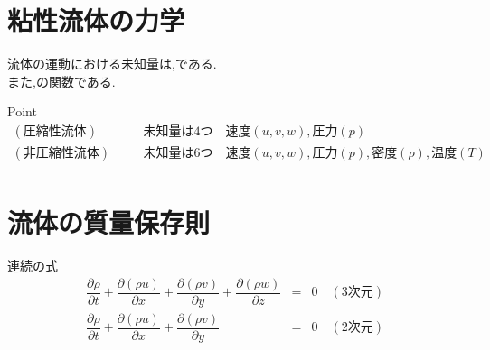 \documentclass[a4paper]{jsarticle}
\begin{document}
\section{粘性流体の力学}
流体の運動における未知量は,である.\\
また,の関数である.\\
\begin{itembox}[l]{Point}
    \begin{eqnarray*}
        (圧縮性流体)&&\quad 未知量は4つ\quad 速度\left(u,v,w\right),圧力\left(p\right)\\
        (非圧縮性流体)&&\quad 未知量は6つ\quad 速度\left(u,v,w\right),圧力\left(p\right),密度\left(\rho\right),温度\left(T\right)\\
    \end{eqnarray*}
\end{itembox}
\section{流体の質量保存則}
\begin{itembox}[l]{連続の式}
    \begin{eqnarray*}
        \dfrac{\partial\rho}{\partial t}+\dfrac{\partial \left(\rho u\right)}{\partial x}+\dfrac{\partial \left(\rho v\right)}{\partial y}+\dfrac{\partial \left(\rho w\right)}{\partial z}&=&0\quad(3次元)\\
        \dfrac{\partial\rho}{\partial t}+\dfrac{\partial \left(\rho u\right)}{\partial x}+\dfrac{\partial \left(\rho v\right)}{\partial y}&=&0\quad(2次元)\\
    \end{eqnarray*}
\end{itembox}
\end{document}
